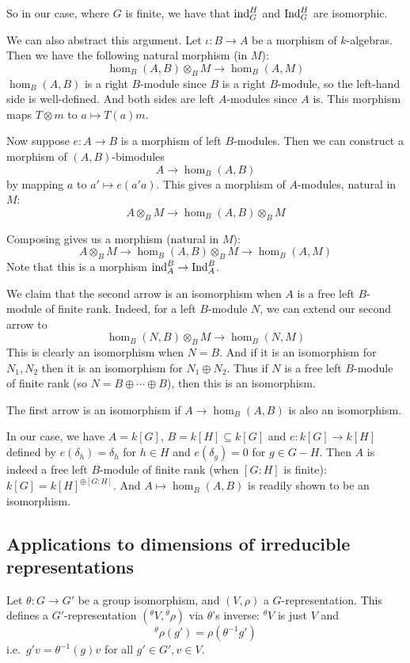 So in our case, where $G$ is finite, we have that ${\rm ind}^H_G$ and ${\rm Ind}^H_G$ are isomorphic.

We can also abstract this argument.
Let $\iota\colon B\to A$ be a morphism of $k$-algebras.
Then we have the following natural morphism (in $M$):
$$ \hom_B(A,B)\otimes_B M \to \hom_B(A,M) $$
$\hom_B(A,B)$ is a right $B$-module since $B$ is a right $B$-module, so the left-hand side is well-defined.
And both sides are left $A$-modules since $A$ is.
This morphism maps $T\otimes m$ to $a\mapsto T(a)m$.

Now suppose $e\colon A\to B$ is a morphism of left $B$-modules.
Then we can construct a morphism of $(A,B)$-bimodules
$$ A\to\hom_B(A,B) $$
by mapping $a$ to $a'\mapsto e(a'a)$.
This gives a morphism of $A$-modules, natural in $M$:
$$ A\otimes_BM\to\hom_B(A,B)\otimes_BM $$

Composing gives us a morphism (natural in $M$):
$$ A\otimes_BM\to\hom_B(A,B)\otimes_BM\to\hom_B(A,M) $$
Note that this is a morphism ${\rm ind}^B_A\to{\rm Ind}^B_A$.

We claim that the second arrow is an isomorphism when $A$ is a free left $B$-module of finite rank.
Indeed, for a left $B$-module $N$, we can extend our second arrow to
$$ \hom_B(N,B)\otimes_BM\to\hom_B(N,M) $$
This is clearly an isomorphism when $N=B$.
And if it is an isomorphism for $N_1,N_2$ then it is an isomorphism for $N_1\oplus N_2$.
Thus if $N$ is a free left $B$-module of finite rank (so $N=B\oplus\cdots\oplus B$), then this is an isomorphism.

The first arrow is an isomorphism if $A\to\hom_B(A,B)$ is also an isomorphism.

In our case, we have $A=k[G]$, $B=k[H]\subseteq k[G]$ and $e\colon k[G]\to k[H]$ defined by $e(\delta_h)=\delta_h$ for $h\in H$ and $e(\delta_g)=0$ for $g\in G-H$.
Then $A$ is indeed a free left $B$-module of finite rank (when $[G:H]$ is finite): $k[G]=k[H]^{\oplus[G:H]}$.
And $A\mapsto\hom_B(A,B)$ is readily shown to be an isomorphism.

\subsection{Applications to dimensions of irreducible representations}

\bdefn

    Let $\theta\colon G\to G'$ be a group isomorphism, and $(V,\rho)$ a $G$-representation.
    This defines a $G'$-representation $({}^\theta V,{}^\theta\rho)$ via $\theta$'s inverse: ${}^\theta V$ is just $V$ and
    $$ {}^\theta\rho(g') = \rho(\theta^{-1}g') $$
    i.e.\ $g'v=\theta^{-1}(g)v$ for all $g'\in G',v\in V$.

